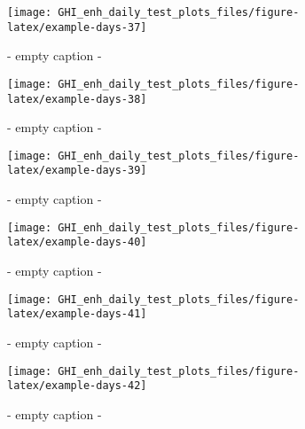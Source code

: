 \documentclass[
  10pt,
  a4paper,oneside]{article}
\begin{document}
\begin{figure}[H]

{\centering \texttt{[image: GHI\_enh\_daily\_test\_plots\_files/figure-latex/example-days-37]} 

}

\caption{ - empty caption - }\label{fig:example-days-37}
\end{figure}

\begin{figure}[H]

{\centering \texttt{[image: GHI\_enh\_daily\_test\_plots\_files/figure-latex/example-days-38]} 

}

\caption{ - empty caption - }\label{fig:example-days-38}
\end{figure}

\begin{figure}[H]

{\centering \texttt{[image: GHI\_enh\_daily\_test\_plots\_files/figure-latex/example-days-39]} 

}

\caption{ - empty caption - }\label{fig:example-days-39}
\end{figure}

\begin{figure}[H]

{\centering \texttt{[image: GHI\_enh\_daily\_test\_plots\_files/figure-latex/example-days-40]} 

}

\caption{ - empty caption - }\label{fig:example-days-40}
\end{figure}

\begin{figure}[H]

{\centering \texttt{[image: GHI\_enh\_daily\_test\_plots\_files/figure-latex/example-days-41]} 

}

\caption{ - empty caption - }\label{fig:example-days-41}
\end{figure}

\begin{figure}[H]

{\centering \texttt{[image: GHI\_enh\_daily\_test\_plots\_files/figure-latex/example-days-42]} 

}

\caption{ - empty caption - }\label{fig:example-days-42}
\end{figure}
\end{document}
